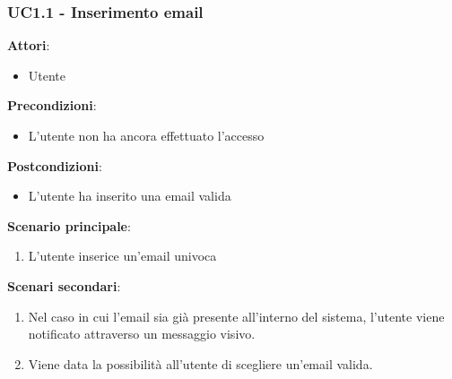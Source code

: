 \subsubsection{UC1.1 - Inserimento email}\label{usecase:1_1}
\textbf{Attori}:
\begin{itemize}
    \item Utente
\end{itemize}
\textbf{Precondizioni}:
\begin{itemize}
    \item L'utente non ha ancora effettuato l'accesso
\end{itemize}
\textbf{Postcondizioni}:
\begin{itemize}
    \item L'utente ha inserito una email valida
\end{itemize}
\textbf{Scenario principale}:
\begin{enumerate}
    \item L'utente inserice un'email univoca
\end{enumerate}
\textbf{Scenari secondari}:
\begin{enumerate}
    \item Nel caso in cui l'email sia già presente all'interno del sistema, l'utente viene notificato attraverso un messaggio visivo.
    \item Viene data la possibilità all'utente di scegliere un'email valida.
\end{enumerate}
